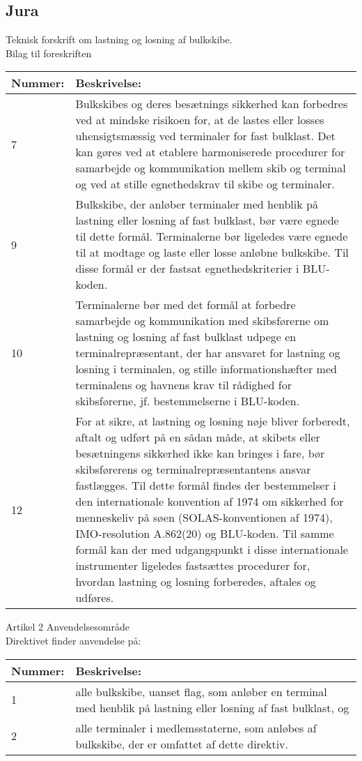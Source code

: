 
\subsection{Jura}
Teknisk forskrift om lastning og losning af bulkskibe.\\
Bilag til foreskriften
\begin{table}[H]
\begin{tabular}{|p{1.5cm}|p{12cm}|} \hline
\cellcolor[gray]{0.85}Nummer: & \cellcolor[gray]{0.85}Beskrivelse:  \\ \hline
7 & Bulkskibes og deres besætnings sikkerhed kan forbedres ved at mindske risikoen for, at de lastes eller losses uhensigtsmæssig ved terminaler for fast bulklast. Det kan gøres ved at etablere harmoniserede procedurer for samarbejde og kommunikation mellem skib og terminal og ved at stille egnethedskrav til skibe og terminaler.   \\ \hline
9 & Bulkskibe, der anløber terminaler med henblik på lastning eller losning af fast bulklast, bør være egnede til dette formål. Terminalerne bør ligeledes være egnede til at modtage og laste eller losse anløbne bulkskibe. Til disse formål er der fastsat egnethedskriterier i BLU-koden. \\ \hline
10 & Terminalerne bør med det formål at forbedre samarbejde og kommunikation med skibsførerne om lastning og losning af fast bulklast udpege en terminalrepræsentant, der har ansvaret for lastning og losning i terminalen, og stille informationshæfter med terminalens og havnens krav til rådighed for skibsførerne, jf. bestemmelserne i BLU-koden. \\ \hline
12 &  For at sikre, at lastning og losning nøje bliver forberedt, aftalt og udført på en sådan måde, at skibets eller besætningens sikkerhed ikke kan bringes i fare, bør skibsførerens og terminalrepræsentantens ansvar fastlægges. Til dette formål findes der bestemmelser i den internationale konvention af 1974 om sikkerhed for menneskeliv på søen (SOLAS-konventionen af 1974), IMO-resolution A.862(20) og BLU-koden. Til samme formål kan der med udgangspunkt i disse internationale instrumenter ligeledes fastsættes procedurer for, hvordan lastning og losning forberedes, aftales og udføres.\\ \hline
\end{tabular}
\end{table}

Artikel 2 Anvendelsesområde\\
Direktivet finder anvendelse på:
\begin{table}[H]
\begin{tabular}{|p{1.5cm}|p{12cm}|} \hline
\cellcolor[gray]{0.85}Nummer: & \cellcolor[gray]{0.85}Beskrivelse:  \\ \hline
1 & alle bulkskibe, uanset flag, som anløber en terminal med henblik på lastning eller losning af fast bulklast, og   \\ \hline
2 & alle terminaler i medlemsstaterne, som anløbes af bulkskibe, der er omfattet af dette direktiv. \\ \hline
\end{tabular}
\end{table}

